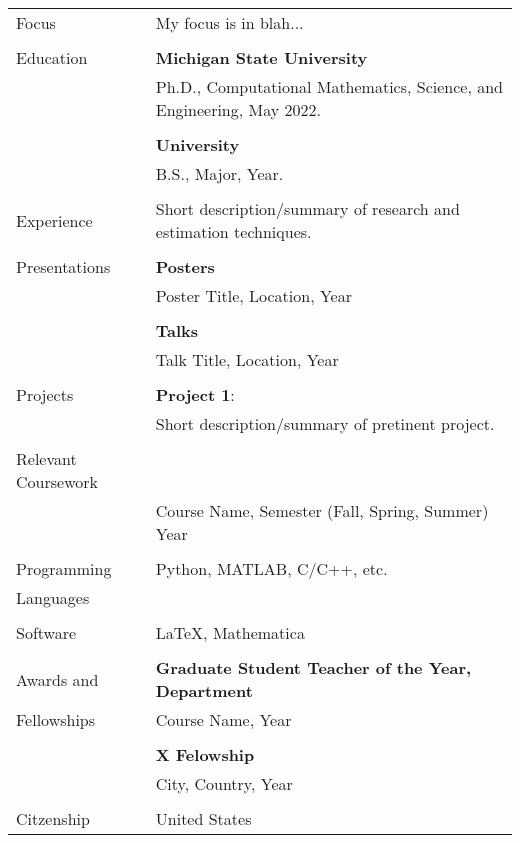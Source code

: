 \noindent \begin{tabular}{@{} l l}

    \Large{Focus} & My focus is in blah...\\
    & \\
    \Large{Education}    & \textbf{Michigan State University} \\
    & Ph.D., Computational Mathematics, Science, and Engineering, May 2022. \\
    & \\
    & \textbf{University} \\
    & B.S., Major, Year. \\
    & \\
    \Large{Experience}    & {\parbox{4.3in}{ \vspace{1.2em} Short description/summary of research and estimation techniques.}}\\
    & \\
    \Large{Presentations}   & \textbf{Posters} \\
    & Poster Title, Location, Year\\
    & \\
    &\textbf{Talks} \\
    & Talk Title, Location, Year\\
    & \\
    \Large{Projects}   & \textbf{Project 1}: \\
    & {\parbox{4.3in}{Short description/summary of pretinent project.}}\\
    & \\
    \Large{Relevant Coursework }    & \\
    & Course Name, Semester (Fall, Spring, Summer) Year \\
    & \\
    \Large{Programming}   & Python, MATLAB, C/C++, etc. \\
    \Large{Languages}& \\
    &\\
    \Large{Software}    & \LaTeX, Mathematica  \\
    &\\
    \Large{Awards and }    & \textbf{Graduate Student Teacher of the Year, Department} \\
    \Large{Fellowships}   & Course Name, Year \\
    & \\
    & \textbf{X Felowship} \\
    & City, Country, Year \\
    & \\
    \Large{Citzenship} & United States

\end{tabular}

%

